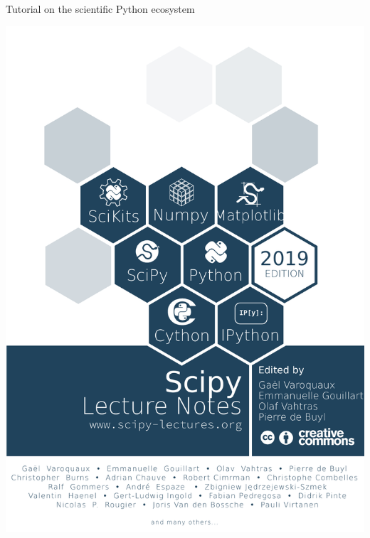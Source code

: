 \documentclass[svgnames]{beamer}
\begin{document}
\begin{frame}{Tutorial on the scientific Python ecosystem}
 \begin{center}
  \includegraphics[height=0.9\textheight]{sln_cover-2019}
 \end{center}
\end{frame}
\end{document}
